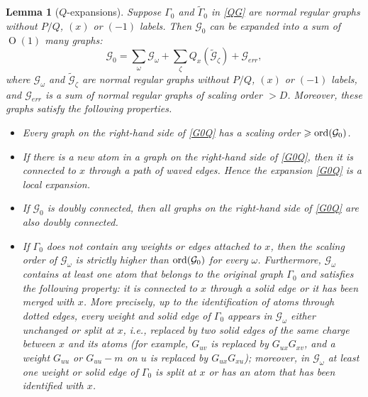 \documentclass{article}
\newcommand{\1}{\mathds{1}}
\numberwithin{equation}{section}
\newcommand{\ord}{{\rm{ord}}}
\newcommand{\be}{\begin{equation}}
\newcommand{\ee}{\end{equation}}
\renewcommand{\cal}{\mathcal}
\newcommand{\wt}{\widetilde}
\renewcommand{\geq}{\geqslant}
\renewcommand{\ge}{\geq}
\DeclareMathOperator{\OO}{O}
\theoremstyle{plain} %
\newtheorem{lemma}[theorem]{Lemma}
\theoremstyle{remark}
\newcommand{\cor}{\color{red}}
\newcommand{\hty}[1]{{\cor (ht: #1) }}
\begin{document}
\begin{lemma}[$Q$-expansions]\label{Q_lemma}
Suppose $\Gamma_0$ and $\wt\Gamma_0$ in \eqref{QG} are normal regular graphs without $P/Q$, $(x)$ or $(-1)$ labels. %
Then $\cal G_0$ can be expanded into a sum of $\OO(1)$ many graphs:
\be\label{G0Q} \cal G_0 = \sum_\omega \cal G_\omega + \sum_\zeta Q_x(\wt{\cal G}_\zeta)  + \cal G_{err},\ee
where $\cal G_{\omega}$ and $\wt{\cal G}_\zeta$ are normal regular graphs without $P/Q$, $(x)$ or $(-1)$ labels, and $\cal G_{err}$ is a sum of normal regular graphs of scaling order $>D$. Moreover, these graphs satisfy the following properties.
\begin{itemize}
	\item[(i)] Every graph on the right-hand side of \eqref{G0Q} has a scaling order $\ge \ord(\cal G_0)$.
	
	\item[(ii)] If there is a new atom in a graph on the right-hand side of \eqref{G0Q}, then it is connected to $x$ through a path of waved edges. Hence the expansion \eqref{G0Q} is a local expansion. 
	
	\item[(iii)] If $\cal G_0$ is doubly connected, then all graphs on the right-hand side of \eqref{G0Q} are also doubly connected.
	
	\item[(iv)] If $\Gamma_0$ does not contain any weights or edges attached to $x$, then the scaling order of  $\cal G_\omega$ is  strictly higher than $\ord(\cal G_0)$ for every $\omega$.
 Furthermore,  $\cal G_\omega$ contains at least one atom that belongs to the original graph $\Gamma_0$ and satisfies the following property: it is connected to $x$ through a solid edge or it has been merged with $x$. More precisely, up to the identification of atoms through dotted edges, every weight and solid edge of $\Gamma_0$ appears in $\cal G_\omega$ either unchanged or \emph{split at $x$}, i.e., replaced by two solid edges of the same charge between $x$ and its atoms (for example, $G_{uv}$ is replaced by $G_{ux}G_{xv}$, and a weight $G_{uu}$ or $G_{uu}-m$ on $u$ is replaced by $G_{ux}G_{xu}$); moreover, in $\cal G_\omega$ at least one weight or solid edge of $\Gamma_0$ is split at $x$ or has an atom that has been identified with $x$.
	
	
\end{itemize}
\end{lemma}
\end{document}

